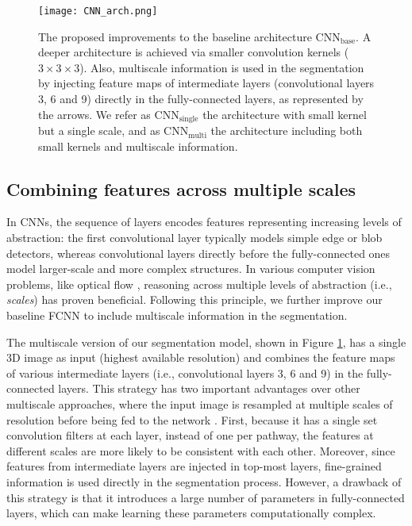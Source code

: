 \documentclass[twoside,fleqn,espcrc2]{elsarticle}
\newcommand{\CNNbase}{\mr{CNN}_\mr{base}}
\newcommand{\CNNsingle}{\mr{CNN}_\mr{single}}
\newcommand{\CNNmulti}{\mr{CNN}_\mr{multi}}
\newcommand{\mr}[1]{\mathrm{#1}}
\newcommand{\vold}[1]{$#1\!\times\!#1\!\times\!#1$}
\begin{document}
\begin{figure}[h!]
     \begin{center}

        \texttt{[image: CNN\_arch.png]}
\caption{The proposed improvements to the baseline architecture $\CNNbase$. A deeper architecture is achieved via smaller convolution kernels (\vold{3}). Also, multiscale information is used in the segmentation by injecting feature maps of intermediate layers (convolutional layers 3, 6 and 9) directly in the fully-connected layers, as represented by the arrows. We refer as $\CNNsingle$ the architecture with small kernel but a single scale, and as $\CNNmulti$ the architecture including both small kernels and multiscale information.}
 \label{fig:CNN_archit}
\end{center}
\end{figure}


\subsection{Combining features across multiple scales}
\label{ssec:combiningFeatures}


In CNNs, the sequence of layers encodes features representing increasing levels of abstraction: the first convolutional layer typically models simple edge or blob detectors, whereas convolutional layers directly before the fully-connected ones model larger-scale and more complex structures. In various computer vision problems, like optical flow \cite{brox2004high}, reasoning across multiple levels of abstraction (i.e., \emph{scales}) has proven beneficial. Following this principle, we further improve our baseline FCNN to include multiscale information in the segmentation.

The multiscale version of our segmentation model, shown in Figure \ref{fig:CNN_archit}, has a single 3D image as input (highest available resolution) and combines the feature maps of various intermediate layers (i.e., convolutional layers 3, 6 and 9) in the fully-connected layers. This strategy \cite{farabet2013learning,chen2014semantic,chen2015semantic,hariharan2015hypercolumns} has two important advantages over other multiscale approaches, where the input image is resampled at multiple scales of resolution before being fed to the network \cite{kamnitsas2016efficient}. First, because it has a single set convolution filters at each layer, instead of one per pathway, the features at different scales are more likely to be consistent with each other. Moreover, since features from intermediate layers are injected in top-most layers, fine-grained information is used directly in the segmentation process. However, a drawback of this strategy is that it introduces a large number of parameters in fully-connected layers, which can make learning these parameters computationally complex.
\end{document}
